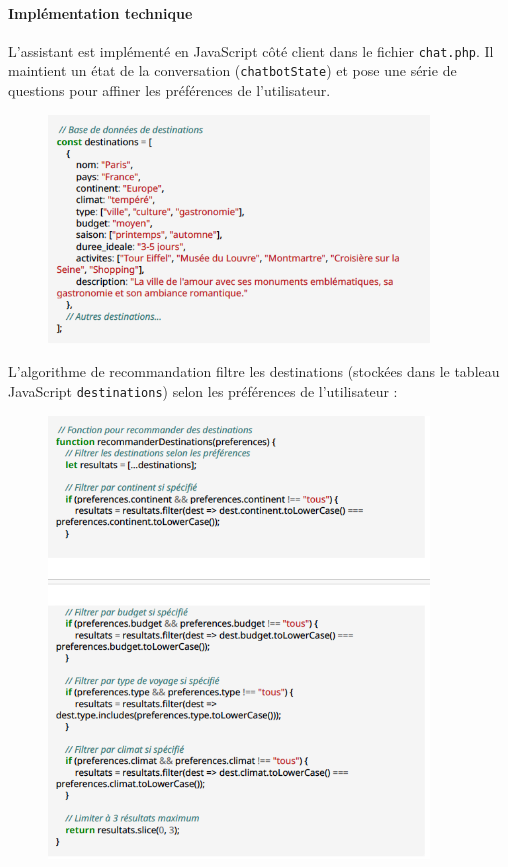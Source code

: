 \documentclass[a4paper,12pt]{article}
\begin{document}
\paragraph{Implémentation technique}
L’assistant est implémenté en JavaScript côté client dans le fichier \texttt{chat.php}. Il maintient un état de la conversation (\texttt{chatbotState}) et pose une série de questions pour affiner les préférences de l'utilisateur.
\begin{figure}[H]
  \centering
  \includegraphics[width=0.9\textwidth]{capture6.png}
\end{figure}
L'algorithme de recommandation filtre les destinations (stockées dans le tableau JavaScript \texttt{destinations}) selon les préférences de l'utilisateur :
\begin{figure}[H]
  \centering
  \includegraphics[width=0.9\textwidth]{capture7.png}
\end{figure}
\end{document}
